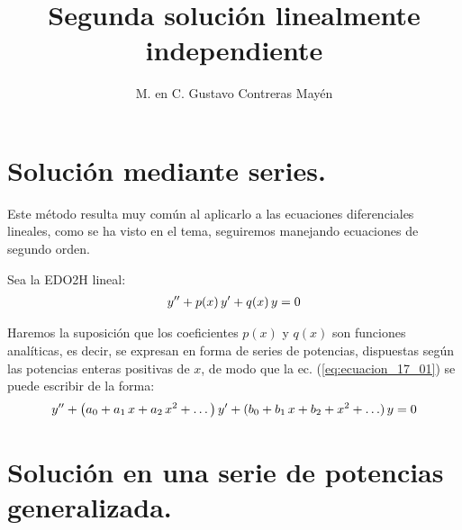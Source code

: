 
\title{Segunda solución linealmente independiente} \vspace{-3ex}
\author{M. en C. Gustavo Contreras Mayén}
\date{ }
\newcommand{\Cancel}[2][black]{{\color{#1}\cancel{\color{black}#2}}}

\vspace{-4cm}
\maketitle
\fontsize{14}{14}\selectfont
\tableofcontents
\newpage

\section{Solución mediante series.}

Este método resulta muy común al aplicarlo a las ecuaciones diferenciales lineales, como se ha visto en el tema, seguiremos manejando ecuaciones de segundo orden.
\par
Sea la EDO2H lineal:
\begin{align}
{y}^{\prime \prime} + p(x) \, {y}^{\prime} + q(x) \, y = 0
\label{eq:ecuacion_17_01}
\end{align}

Haremos la suposición que los coeficientes $p(x)$ y $q(x)$ son funciones analíticas, es decir, se expresan en forma de series de potencias, dispuestas según las potencias enteras positivas de $x$, de modo que la ec. (\ref{eq:ecuacion_17_01}) se puede escribir de la forma:
\begin{align}
{y}^{\prime \prime} + \big( a_{0} + a_{1} \, x + a_{2} \, x^{2} + \ldots \big) \, {y}^{\prime} + (b_{0} + b_{1} \, x + b_{2} + x^{2} + \ldots) \, y = 0
\label{eq:ecuacion_17_02}
\end{align}

\section{Solución en una serie de potencias generalizada.}

